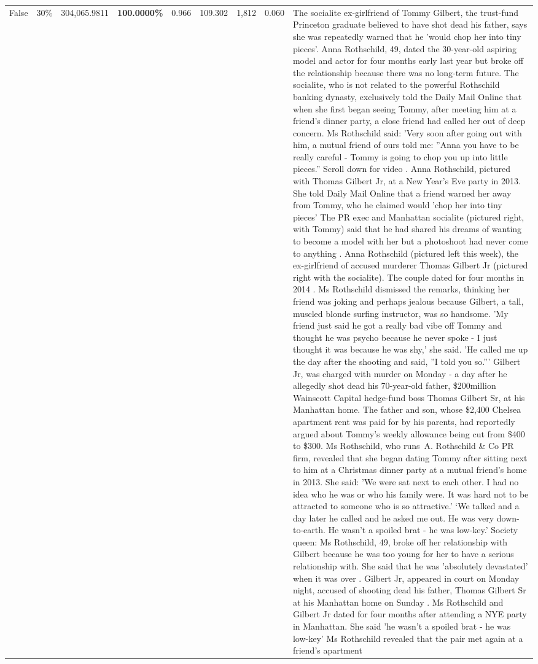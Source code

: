 \begin{table}[H]
\begin{tabular}{lllrlllll}
False & 30\% & \color{red} 304,065.9811 & \bfseries \color{red} 100.0000\% & 0.966 & 109.302 & 1,812 & 0.060 & The socialite ex-girlfriend of Tommy Gilbert, the trust-fund Princeton graduate believed to have shot dead his father, says she was repeatedly warned that he 'would chop her into tiny pieces'. Anna Rothschild, 49, dated the 30-year-old aspiring model and actor for four months early last year but broke off the relationship because there was no long-term future. The socialite, who is not related to the powerful Rothschild banking dynasty, exclusively told the Daily Mail Online that when she first began seeing Tommy, after meeting him at a friend's dinner party, a close friend had called her out of deep concern. Ms Rothschild said: 'Very soon after going out with him, a mutual friend of ours told me: ''Anna you have to be really careful - Tommy is going to chop you up into little pieces.'' Scroll down for video . Anna Rothschild, pictured with Thomas Gilbert Jr, at a New Year's Eve party in 2013. She told Daily Mail Online that a friend warned her away from Tommy, who he claimed would 'chop her into tiny pieces' The PR exec and Manhattan socialite (pictured right, with Tommy) said that he had shared his dreams of wanting to become a model with her but a photoshoot had never come to anything . Anna Rothschild (pictured left this week), the ex-girlfriend of accused murderer Thomas Gilbert Jr (pictured right with the socialite). The couple dated for four months in 2014 . Ms Rothschild dismissed the remarks, thinking her friend was joking and perhaps jealous because Gilbert, a tall, muscled blonde surfing instructor, was so handsome. 'My friend just said he got a really bad vibe off Tommy and thought he was psycho because he never spoke - I just thought it was because he was shy,' she said. 'He called me up the day after the shooting and said, ''I told you so.''' Gilbert Jr, was charged with murder on Monday - a day after he allegedly shot dead his 70-year-old father, \$200million Wainscott Capital hedge-fund boss Thomas Gilbert Sr, at his Manhattan home. The father and son, whose \$2,400 Chelsea apartment rent was paid for by his parents, had reportedly argued about Tommy's weekly allowance being cut from \$400 to \$300. Ms Rothschild, who runs A. Rothschild \& Co PR firm, revealed that she began dating Tommy after sitting next to him at a Christmas dinner party at a mutual friend's home in 2013. She said: 'We were sat next to each other. I had no idea who he was or who his family were. It was hard not to be attracted to someone who is so attractive.' ‘We talked and a day later he called and he asked me out. He was very down-to-earth. He wasn’t a spoiled brat - he was low-key.’ Society queen: Ms Rothschild, 49, broke off her relationship with Gilbert because he was too young for her to have a serious relationship with. She said that he was 'absolutely devastated' when it was over . Gilbert Jr, appeared in court on Monday night, accused of shooting dead his father, Thomas Gilbert Sr at his Manhattan home on Sunday . Ms Rothschild and Gilbert Jr dated for four months after attending a NYE party in Manhattan. She said 'he wasn't a spoiled brat - he was low-key' Ms Rothschild revealed that the pair met again at a friend’s apartment 
\end{tabular}
\end{table}
